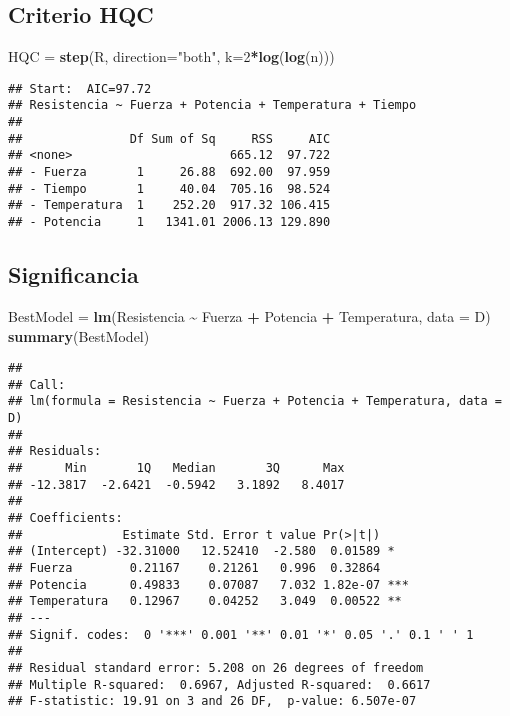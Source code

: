 \documentclass[
]{article}
\newenvironment{Shaded}{\begin{snugshade}}{\end{snugshade}}
\newcommand{\AttributeTok}[1]{\textcolor[rgb]{0.13,0.29,0.53}{#1}}
\newcommand{\DecValTok}[1]{\textcolor[rgb]{0.00,0.00,0.81}{#1}}
\newcommand{\FunctionTok}[1]{\textcolor[rgb]{0.13,0.29,0.53}{\textbf{#1}}}
\newcommand{\NormalTok}[1]{#1}
\newcommand{\OtherTok}[1]{\textcolor[rgb]{0.56,0.35,0.01}{#1}}
\newcommand{\SpecialCharTok}[1]{\textcolor[rgb]{0.81,0.36,0.00}{\textbf{#1}}}
\newcommand{\StringTok}[1]{\textcolor[rgb]{0.31,0.60,0.02}{#1}}
\begin{document}
\subsection{Criterio HQC}\label{criterio-hqc}

\begin{Shaded}
\begin{Highlighting}[]
\NormalTok{HQC }\OtherTok{=} \FunctionTok{step}\NormalTok{(R, }\AttributeTok{direction=}\StringTok{"both"}\NormalTok{, }\AttributeTok{k=}\DecValTok{2}\SpecialCharTok{*}\FunctionTok{log}\NormalTok{(}\FunctionTok{log}\NormalTok{(n)))}
\end{Highlighting}
\end{Shaded}

\begin{verbatim}
## Start:  AIC=97.72
## Resistencia ~ Fuerza + Potencia + Temperatura + Tiempo
## 
##               Df Sum of Sq     RSS     AIC
## <none>                      665.12  97.722
## - Fuerza       1     26.88  692.00  97.959
## - Tiempo       1     40.04  705.16  98.524
## - Temperatura  1    252.20  917.32 106.415
## - Potencia     1   1341.01 2006.13 129.890
\end{verbatim}

\subsection{Significancia}\label{significancia}

\begin{Shaded}
\begin{Highlighting}[]
\NormalTok{BestModel }\OtherTok{=} \FunctionTok{lm}\NormalTok{(Resistencia }\SpecialCharTok{\textasciitilde{}}\NormalTok{ Fuerza }\SpecialCharTok{+}\NormalTok{ Potencia }\SpecialCharTok{+}\NormalTok{ Temperatura, }\AttributeTok{data =}\NormalTok{ D)}
\FunctionTok{summary}\NormalTok{(BestModel)}
\end{Highlighting}
\end{Shaded}

\begin{verbatim}
## 
## Call:
## lm(formula = Resistencia ~ Fuerza + Potencia + Temperatura, data = D)
## 
## Residuals:
##      Min       1Q   Median       3Q      Max 
## -12.3817  -2.6421  -0.5942   3.1892   8.4017 
## 
## Coefficients:
##              Estimate Std. Error t value Pr(>|t|)    
## (Intercept) -32.31000   12.52410  -2.580  0.01589 *  
## Fuerza        0.21167    0.21261   0.996  0.32864    
## Potencia      0.49833    0.07087   7.032 1.82e-07 ***
## Temperatura   0.12967    0.04252   3.049  0.00522 ** 
## ---
## Signif. codes:  0 '***' 0.001 '**' 0.01 '*' 0.05 '.' 0.1 ' ' 1
## 
## Residual standard error: 5.208 on 26 degrees of freedom
## Multiple R-squared:  0.6967, Adjusted R-squared:  0.6617 
## F-statistic: 19.91 on 3 and 26 DF,  p-value: 6.507e-07
\end{verbatim}
\end{document}
